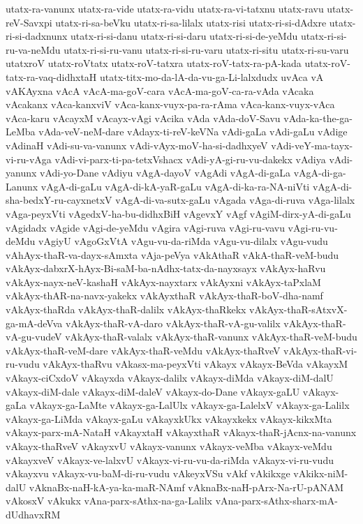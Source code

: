 {utatx-ra-vanunx
utatx-ra-vide
utatx-ra-vidu
utatx-ra-vi-tatxnu
utatx-ravu
utatx-reV-Savxpi
utatx-ri-sa-beVku
utatx-ri-sa-lilalx
utatx-risi
utatx-ri-si-dAdxre
utatx-ri-si-dadxnunx
utatx-ri-si-danu
utatx-ri-si-daru
utatx-ri-si-de-yeMdu
utatx-ri-si-ru-va-neMdu
utatx-ri-si-ru-vanu
utatx-ri-si-ru-varu
utatx-ri-situ
utatx-ri-su-varu
utatxroV
utatx-roVtatx
utatx-roV-tatxra
utatx-roV-tatx-ra-pA-kada
utatx-roV-tatx-ra-vaq-didhxtaH
utatx-titx-mo-da-lA-da-vu-ga-Li-lalxdudx
uvAca
vA
vAKAyxna
vAcA
vAcA-ma-goV-cara
vAcA-ma-goV-ca-ra-vAda
vAcaka
vAcakanx
vAca-kanxviV
vAca-kanx-vuyx-pa-ra-rAma
vAca-kanx-vuyx-vAca
vAca-karu
vAcayxM
vAcayx-vAgi
vAcika
vAda
vAda-doV-Savu
vAda-ka-the-ga-LeMba
vAda-veV-neM-dare
vAdayx-ti-reV-keVNa
vAdi-gaLa
vAdi-gaLu
vAdige
vAdinaH
vAdi-su-va-vanunx
vAdi-vAyx-moV-ha-si-dadhxyeV
vAdi-veY-ma-tayx-vi-ru-vAga
vAdi-vi-parx-ti-pa-tetxVshacx
vAdi-yA-gi-ru-vu-dakekx
vAdiya
vAdi-yanunx
vAdi-yo-Dane
vAdiyu
vAgA-dayoV
vAgAdi
vAgA-di-gaLa
vAgA-di-ga-Lanunx
vAgA-di-gaLu
vAgA-di-kA-yaR-gaLu
vAgA-di-ka-ra-NA-niVti
vAgA-di-sha-bedxY-ru-cayxnetxV
vAgA-di-va-sutx-gaLu
vAgada
vAga-di-ruva
vAga-lilalx
vAga-peyxVti
vAgedxV-ha-bu-didhxBiH
vAgevxY
vAgf
vAgiM-dirx-yA-di-gaLu
vAgidadx
vAgide
vAgi-de-yeMdu
vAgira
vAgi-ruva
vAgi-ru-vavu
vAgi-ru-vu-deMdu
vAgiyU
vAgoGxVtA
vAgu-vu-da-riMda
vAgu-vu-dilalx
vAgu-vudu
vAhAyx-thaR-va-dayx-sAmxta
vAja-peVya
vAkAthaR
vAkA-thaR-veM-budu
vAkAyx-dabxrX-hAyx-Bi-saM-ba-nAdhx-tatx-da-nayxsayx
vAkAyx-haRvu
vAkAyx-nayx-neV-kashaH
vAkAyx-nayxtarx
vAkAyxni
vAkAyx-taPxlaM
vAkAyx-thAR-na-navx-yakekx
vAkAyxthaR
vAkAyx-thaR-boV-dha-namf
vAkAyx-thaRda
vAkAyx-thaR-dalilx
vAkAyx-thaRkekx
vAkAyx-thaR-sAtxvX-ga-mA-deVva
vAkAyx-thaR-vA-daro
vAkAyx-thaR-vA-gu-valilx
vAkAyx-thaR-vA-gu-vudeV
vAkAyx-thaR-valalx
vAkAyx-thaR-vanunx
vAkAyx-thaR-veM-budu
vAkAyx-thaR-veM-dare
vAkAyx-thaR-veMdu
vAkAyx-thaRveV
vAkAyx-thaR-vi-ru-vudu
vAkAyx-thaRvu
vAkasx-ma-peyxVti
vAkayx
vAkayx-BeVda
vAkayxM
vAkayx-ciCxdoV
vAkayxda
vAkayx-dalilx
vAkayx-diMda
vAkayx-diM-dalU
vAkayx-diM-dale
vAkayx-diM-daleV
vAkayx-do-Dane
vAkayx-gaLU
vAkayx-gaLa
vAkayx-ga-LaMte
vAkayx-ga-LalUlx
vAkayx-ga-LalelxV
vAkayx-ga-Lalilx
vAkayx-ga-LiMda
vAkayx-gaLu
vAkayxkUkx
vAkayxkekx
vAkayx-kikxMta
vAkayx-parx-mA-NataH
vAkayxtaH
vAkayxthaR
vAkayx-thaR-jAcnx-na-vanunx
vAkayx-thaRveV
vAkayxvU
vAkayx-vanunx
vAkayx-veMba
vAkayx-veMdu
vAkayxveV
vAkayx-ve-lalxvU
vAkayx-vi-ru-vu-da-riMda
vAkayx-vi-ru-vudu
vAkayxvu
vAkayx-vu-baM-di-ru-vudu
vAkeyxVSu
vAkf
vAkikxge
vAkikx-niM-dalU
vAknaBx-naH-kA-ya-ka-maR-NAmf
vAknaBx-naH-pArx-Na-rU-pANAM
vAkosxV
vAkukx
vAna-parx-sAthx-na-ga-Lalilx
vAna-parx-sAthx-sharx-mA-dUdhavxRM
}
